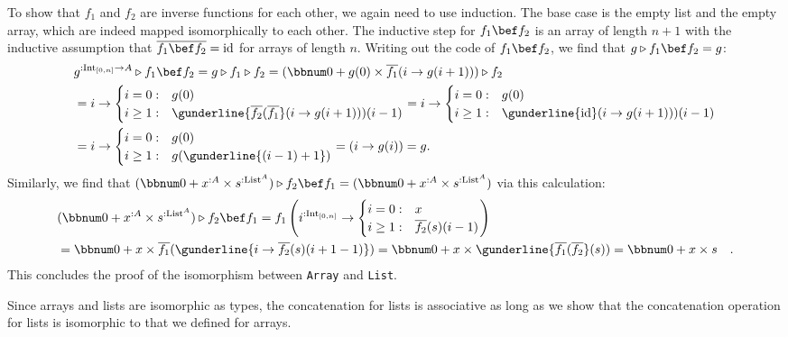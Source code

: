To show that $f_{1}$ and $f_{2}$ are inverse functions for each
other, we again need to use induction. The base case is the empty
list and the empty array, which are indeed mapped isomorphically to
each other. The inductive step for $f_{1}\bef f_{2}$ is an array
of length $n+1$ with the inductive assumption that $\overline{f_{1}\bef f_{2}}=\text{id}$
for arrays of length $n$. Writing out the code of $f_{1}\bef f_{2}$,
we find that $g\triangleright f_{1}\bef f_{2}=g$:
\begin{align*}
 & g^{:\text{Int}_{[0,n]}\rightarrow A}\triangleright f_{1}\bef f_{2}=g\triangleright f_{1}\triangleright f_{2}=(\bbnum 0+g(0)\times\overline{f_{1}}(i\rightarrow g(i+1)))\triangleright f_{2}\\
 & =i\rightarrow\begin{cases}
i=0: & g(0)\\
i\geq1: & \gunderline{\overline{f_{2}}(\overline{f_{1}}}(i\rightarrow g(i+1)))(i-1)
\end{cases}=i\rightarrow\begin{cases}
i=0: & g(0)\\
i\geq1: & \gunderline{\text{id}}(i\rightarrow g(i+1)))(i-1)
\end{cases}\\
 & =i\rightarrow\begin{cases}
i=0: & g(0)\\
i\geq1: & g(\gunderline{\left(i-1\right)+1})
\end{cases}=\left(i\rightarrow g(i)\right)=g.
\end{align*}
Similarly, we find that $(\bbnum 0+x^{:A}\times s^{:\text{List}^{A}})\triangleright f_{2}\bef f_{1}=(\bbnum 0+x^{:A}\times s^{:\text{List}^{A}})$
via this calculation:
\begin{align*}
 & (\bbnum 0+x^{:A}\times s^{:\text{List}^{A}})\triangleright f_{2}\bef f_{1}=f_{1}\left(i^{:\text{Int}_{[0,n]}}\rightarrow\begin{cases}
i=0: & x\\
i\geq1: & \overline{f_{2}}(s)(i-1)
\end{cases}\right)\\
 & =\bbnum 0+x\times\overline{f_{1}}(\gunderline{i\rightarrow\overline{f_{2}}(s)(i+1-1)})=\bbnum 0+x\times\gunderline{\overline{f_{1}}(\overline{f_{2}}}(s))=\bbnum 0+x\times s\quad.
\end{align*}
This concludes the proof of the isomorphism between \lstinline!Array!
and \lstinline!List!. 

Since arrays and lists are isomorphic as types, the concatenation
for lists is associative as long as we show that the concatenation
operation for lists is isomorphic to that we defined for arrays.

